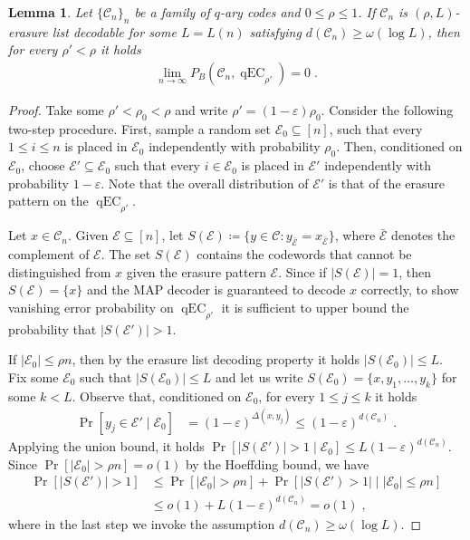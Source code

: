 \documentclass{article}
\newcommand{\eps}{\varepsilon}
\DeclareMathOperator{\qEC}{qEC}
\newcommand{\cE}{\mathcal{E}}
\newcommand{\cC}{\mathcal{C}}
\theoremstyle{plain}
\theoremstyle{plain}
\theoremstyle{plain}
\theoremstyle{plain}
\theoremstyle{plain}
\theoremstyle{plain}
\theoremstyle{plain}
\newtheorem{lemma}[definition]{Lemma}%
\theoremstyle{plain}
\theoremstyle{plain}
\theoremstyle{plain}
\theoremstyle{remark}
\theoremstyle{remark}
\theoremstyle{remark}
\theoremstyle{plain}
\begin{document}
\begin{lemma}\label{clm:erasure_reliability}
Let $\{\cC_n\}_n$ be a family of $q$-ary codes and $0\le\rho\le 1$.
If $\cC_n$ is $(\rho,L)$-erasure list decodable for some $L=L(n)$
satisfying $d(\cC_n)\ge \omega(\log L)$, then for every $\rho'<\rho$ it
holds
\begin{align*}
    \lim_{n\to\infty}P_{B}(\cC_n,\qEC_{\rho'})=0\;.
\end{align*}
\end{lemma}
\begin{proof}
Take some $\rho'<\rho_0<\rho$ and write $\rho'=(1-\eps)\rho_0$.
 Consider the following two-step procedure.
First, sample a random set $\cE_0\subseteq [n]$,
such that every $1\le i\le n$ is placed in $\cE_0$ independently
with probability $\rho_0$. Then, conditioned on $\cE_0$,
choose $\cE'\subseteq\cE_0$ such that every $i\in\cE_0$ is
placed in $\cE'$ independently with probability $1-\eps$.
Note that the overall distribution of $\cE'$ is that of the
erasure pattern on the $\qEC_{\rho'}$.

Let $x\in\cC_n$.
Given $\cE\subseteq[n]$, let 
$S(\cE)\coloneqq\{y\in\cC: y_{\bar{\cE}}=x_{\bar{\cE}}\}$, where
$\bar{\cE}$ denotes the complement of $\cE$. The set $S(\cE)$
contains the codewords that cannot be distinguished from $x$ given
the erasure pattern $\cE$. Since if $|S(\cE)|=1$, then
$S(\cE)=\{x\}$ and the MAP decoder
is guaranteed to decode $x$ correctly, 
to show vanishing error probability on $\qEC_{\rho'}$
it is sufficient to upper
bound the probability that $|S(\cE')|>1$.

If $|\cE_0|\le \rho n$, then by the erasure list decoding property
it holds $|S(\cE_0)|\le L$. Fix some $\cE_0$ such that
$|S(\cE_0)|\le L$ and let us write $S(\cE_0)=\{x,y_1,\ldots,y_k\}$ for
some $k<L$. Observe that, conditioned on $\cE_0$, 
for every $1\le j\le k$ it holds
\begin{align*}
    \Pr\left[y_j\in \cE'\;\vert\; \cE_0\right]
    &=(1-\eps)^{\Delta(x,y_j)}\le (1-\eps)^{d(\cC_n)}\;.
\end{align*}
Applying the union bound, it holds $\Pr[|S(\cE')|>1\;\vert\;\cE_0]
\le L(1-\eps)^{d(\cC_n)}$. Since $\Pr[|\cE_0|>\rho n]=o(1)$ by the Hoeffding
bound, we have
\begin{align*}
\Pr\left[|S(\cE')|>1\right]
&\le \Pr\left[|\cE_0|>\rho n\right]
+\Pr\left[|S(\cE')>1|\;\vert\; |\cE_0|\le\rho n\right]\\
&\le o(1)+L(1-\eps)^{d(\cC_n)}=o(1)\;,
\end{align*}
where in the last step we invoke the assumption
$d(\cC_n)\ge \omega(\log L)$.
\end{proof}
\end{document}

